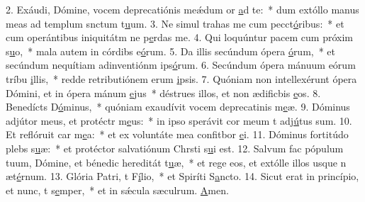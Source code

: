 2. Exáudi, Dómine, vocem deprecatiónis meǽdum or \uline{a}d te:~* dum extóllo manus meas ad templum snctum t\uline{u}um.
3. Ne simul trahas me cum pecct\uline{ó}ribus:~* et cum operántibus iniquitátm ne p\uline{e}rdas me.
4. Qui loquúntur pacem cum próxim s\uline{u}o,~* mala autem in córdibs e\uline{ó}rum.
5. Da illis secúndum ópera \uline{ó}rum,~* et secúndum nequítiam adinventiónm ips\uline{ó}rum.
6. Secúndum ópera mánuum eórum tríbu \uline{i}llis,~* redde retributiónem erum \uline{i}psis.
7. Quóniam non intellexérunt ópera Dómini, et in ópera mánum \uline{e}jus~* déstrues illos, et non ædificbis \uline{e}os.
8. Benedícts D\uline{ó}minus,~* quóniam exaudívit vocem deprecatinis m\uline{e}æ.
9. Dóminus adjútor meus, et protéctr m\uline{e}us:~* in ipso sperávit cor meum t adj\uline{ú}tus sum.
10. Et reflóruit car m\uline{e}a:~* et ex voluntáte mea confitbor \uline{e}i.
11. Dóminus fortitúdo plebs s\uline{u}æ:~* et protéctor salvatiónum Chrsti s\uline{u}i est.
12. Salvum fac pópulum tuum, Dómine, et bénedic hereditát t\uline{u}æ,~* et rege eos, et extólle illos usque n æt\uline{é}rnum.
13. Glória Patri, t F\uline{í}lio,~* et Spiríti S\uline{a}ncto.
14. Sicut erat in princípio, et nunc, t s\uline{e}mper,~* et in sǽcula sæculrum. \uline{A}men.
